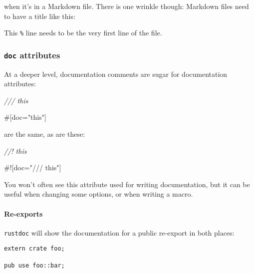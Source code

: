 \documentclass[a4paper,]{book}
\newenvironment{Shaded}{\begin{snugshade}}{\end{snugshade}}
\newcommand{\StringTok}[1]{\textcolor[rgb]{0.31,0.60,0.02}{{#1}}}
\newcommand{\CommentTok}[1]{\textcolor[rgb]{0.56,0.35,0.01}{\textit{{#1}}}}
\newcommand{\AttributeTok}[1]{\textcolor[rgb]{0.77,0.63,0.00}{{#1}}}
\newcommand{\NormalTok}[1]{{#1}}
\let\oldparagraph\paragraph
\renewcommand{\paragraph}[1]{\oldparagraph{#1}\mbox{}}
\begin{document}
when it's in a Markdown file. There is one wrinkle though: Markdown
files need to have a title like this:

\begin{Shaded}
\end{Shaded}

This \texttt{\%} line needs to be the very first line of the file.

\subsubsection{\texorpdfstring{\texttt{doc}
attributes}{doc attributes}}\label{doc-attributes}

At a deeper level, documentation comments are sugar for documentation
attributes:

\begin{Shaded}
\begin{Highlighting}[]
\CommentTok{/// this}

\AttributeTok{#[}\NormalTok{doc}\AttributeTok{=}\StringTok{"this"}\AttributeTok{]}
\end{Highlighting}
\end{Shaded}

are the same, as are these:

\begin{Shaded}
\begin{Highlighting}[]
\CommentTok{//! this}

\AttributeTok{#![}\NormalTok{doc}\AttributeTok{=}\StringTok{"/// this"}\AttributeTok{]}
\end{Highlighting}
\end{Shaded}

You won't often see this attribute used for writing documentation, but
it can be useful when changing some options, or when writing a macro.

\paragraph{Re-exports}\label{re-exports}

\texttt{rustdoc} will show the documentation for a public re-export in
both places:

\begin{verbatim}
extern crate foo;

pub use foo::bar;
\end{verbatim}
\end{document}
